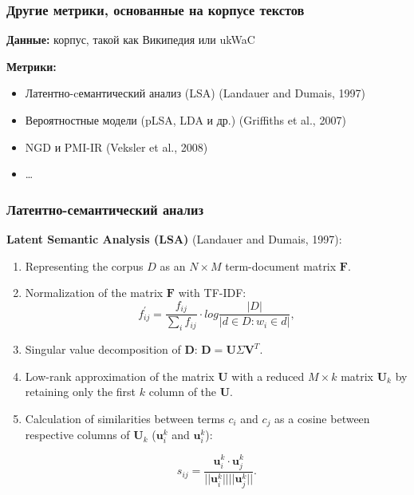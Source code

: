 \begin{frame}
\frametitle{Другие метрики, основанные на корпусе текстов}

\textbf{Данные:} корпус, такой как Википедия или ukWaC
    
    
\textbf{Метрики:}
\begin{itemize} 
\item Латентно-cемантический анализ (LSA) (Landauer and Dumais, 1997)
\item Вероятностные модели (pLSA, LDA и др.) (Griffiths et al., 2007)
\item NGD и PMI-IR (Veksler et al., 2008)
\item \ldots
\end{itemize}
    
\end{frame}



\begin{frame}
\frametitle{Латентно-семантический анализ}
\textbf{Latent Semantic Analysis (LSA)} (Landauer and Dumais, 1997):

\begin{enumerate}
\item Representing the corpus $D$ as an $N \times M$ term-document matrix $\mathbf{F}$.


\item  Normalization of the matrix $\mathbf{F}$ with TF-IDF:
$$
f_{ij}^\prime = \frac{f_{ij}}{\sum_i f_{ij}} \cdot log \frac{|D|}{|d \in D : w_i \in d|},
$$


\item Singular value decomposition of $\mathbf{D}$: $ \mathbf{D} = \mathbf{U} \Sigma \mathbf{V}^T.$

\item Low-rank approximation of the matrix $\mathbf{U}$ with a reduced $M \times k$ matrix $\mathbf{U}_k$ by retaining only the first $k$ column of the $\mathbf{U}$. 

\item Calculation of similarities between terms $c_i$ and $c_j$ as a cosine between respective columns of $\mathbf{U}_k$ ($\mathbf{u}^k_i$ and $\mathbf{u}^k_i$):

$$
s_{ij} = \frac{\mathbf{u}^k_i \cdot \mathbf{u}^k_j}{||\mathbf{u}^k_i|| ||\mathbf{u}^k_j ||}.
$$

\end{enumerate}

\end{frame}







